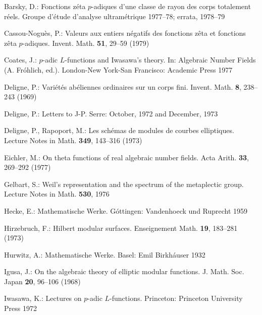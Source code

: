 \documentclass[12pt,a4paper]{article}
\theoremstyle{plain}
\theoremstyle{definition}
\theoremstyle{remark}
\begin{document}
\begin{enumerate}[label={[\arabic*]}, leftmargin=*, itemsep=0.5ex]
\item Barsky, D.: Fonctions z\'{e}ta $p$-adiques d'une classe de rayon des corps totalement r\'{e}els. Groupe d'\'{e}tude d'analyse ultram\'{e}trique 1977--78; errata, 1978--79

\item Cassou-Nogu\`{e}s, P.: Valeurs aux entiers n\'{e}gatifs des fonctions z\^{e}ta et fonctions z\^{e}ta $p$-adiques. Invent. Math. \textbf{51}, 29--59 (1979)

\item Coates, J.: $p$-adic $L$-functions and Iwasawa's theory. In: Algebraic Number Fields (A. Fr\'{o}hlich, ed.). London-New York-San Francisco: Academic Press 1977

\item Deligne, P.: Vari\'{e}t\'{e}s ab\'{e}liennes ordinaires sur un corps fini. Invent. Math. \textbf{8}, 238--243 (1969)

\item Deligne, P.: Letters to J-P. Serre: October, 1972 and December, 1973

\item Deligne, P., Rapoport, M.: Les sch\'{e}mas de modules de courbes elliptiques. Lecture Notes in Math. \textbf{349}, 143--316 (1973)

\item Eichler, M.: On theta functions of real algebraic number fields. Acta Arith. \textbf{33}, 269--292 (1977)

\item Gelbart, S.: Weil's representation and the spectrum of the metaplectic group. Lecture Notes in Math. \textbf{530}, 1976

\item Hecke, E.: Mathematische Werke. G\'{o}ttingen: Vandenhoeck und Ruprecht 1959

\item Hirzebruch, F.: Hilbert modular surfaces. Enseignement Math. \textbf{19}, 183--281 (1973)

\item Hurwitz, A.: Mathematische Werke. Basel: Emil Birkh\'{a}user 1932

\item Igusa, J.: On the algebraic theory of elliptic modular functions. J. Math. Soc. Japan \textbf{20}, 96--106 (1968)

\item Iwasawa, K.: Lectures on $p$-adic $L$-functions. Princeton: Princeton University Press 1972


\end{enumerate}
\end{document}
